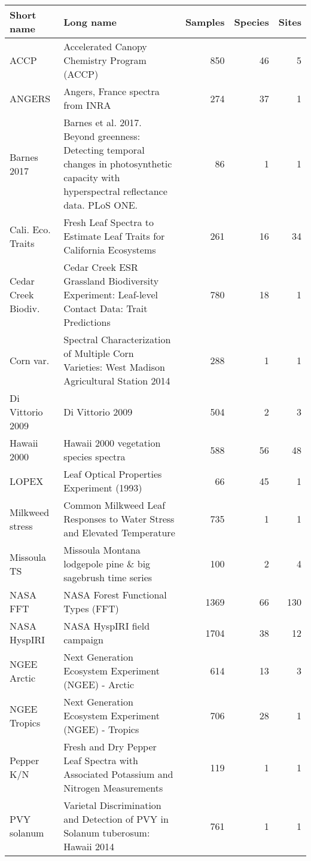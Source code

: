 \begin{table}[H]
\centering\begingroup\fontsize{8}{10}\selectfont

\begin{tabular}{l>{\raggedright\arraybackslash}p{25em}rrr}
\toprule
Short name & Long name & Samples & Species & Sites\\
\midrule
ACCP & Accelerated Canopy Chemistry Program (ACCP) & 850 & 46 & 5\\
ANGERS & Angers, France spectra from INRA & 274 & 37 & 1\\
Barnes 2017 & Barnes et al. 2017. Beyond greenness: Detecting temporal changes in photosynthetic capacity with hyperspectral reflectance data. PLoS ONE. & 86 & 1 & 1\\
Cali. Eco. Traits & Fresh Leaf Spectra to Estimate Leaf Traits for California Ecosystems & 261 & 16 & 34\\
Cedar Creek Biodiv. & 2014 Cedar Creek ESR Grassland Biodiversity Experiment: Leaf-level Contact Data: Trait Predictions & 780 & 18 & 1\\
\addlinespace
Corn var. & Spectral Characterization of Multiple Corn Varieties: West Madison Agricultural Station 2014 & 288 & 1 & 1\\
Di Vittorio 2009 & Di Vittorio 2009 & 504 & 2 & 3\\
Hawaii 2000 & Hawaii 2000 vegetation species spectra & 588 & 56 & 48\\
LOPEX & Leaf Optical Properties Experiment (1993) & 66 & 45 & 1\\
Milkweed stress & Common Milkweed Leaf Responses to Water Stress and Elevated Temperature & 735 & 1 & 1\\
\addlinespace
Missoula TS & Missoula Montana lodgepole pine \& big sagebrush time series & 100 & 2 & 4\\
NASA FFT & NASA Forest Functional Types (FFT) & 1369 & 66 & 130\\
NASA HyspIRI & NASA HyspIRI field campaign & 1704 & 38 & 12\\
NGEE Arctic & Next Generation Ecosystem Experiment (NGEE) - Arctic & 614 & 13 & 3\\
NGEE Tropics & Next Generation Ecosystem Experiment (NGEE) - Tropics & 706 & 28 & 1\\
\addlinespace
Pepper K/N & Fresh and Dry Pepper Leaf Spectra with Associated Potassium and Nitrogen Measurements & 119 & 1 & 1\\
PVY solanum & Varietal Discrimination and Detection of PVY in Solanum tuberosum: Hawaii 2014 & 761 & 1 & 1\\

\end{tabular}
\end{table}
